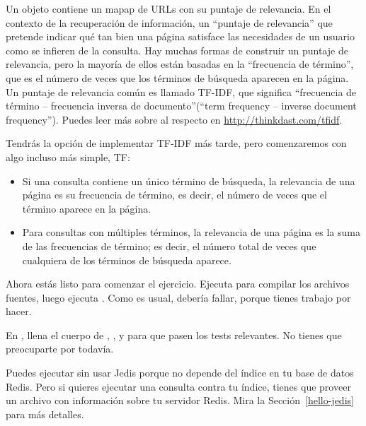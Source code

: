 \documentclass[12pt]{book}
\theoremstyle{exercise}
\begin{document}
Un objeto  contiene un mapap de URLs con su puntaje de
relevancia. En el contexto de la recuperación de información, un ``puntaje
de relevancia'' que pretende indicar qué tan bien una página satisface las
necesidades de un usuario como se infieren de la consulta. Hay muchas formas de
construir un puntaje de relevancia, pero la mayoría de ellos están basadas en
la ``frecuencia de término'', que es el número de veces que los términos de
búsqueda aparecen en la página. Un puntaje de relevancia común es llamado
TF-IDF, que significa ``frecuencia de término -- frecuencia inversa de
documento''(``term frequency -- inverse document frequency'').  Puedes leer más
sobre al respecto en \url{http://thinkdast.com/tfidf}.


Tendrás la opción de implementar TF-IDF más tarde, pero comenzaremos con algo
incluso más simple, TF:

\begin{itemize}

\item
  Si una consulta contiene un único término de búsqueda, la relevancia de una
  página es su frecuencia de término, es decir, el número de veces que el término
  aparece en la página.

\item
  Para consultas con múltiples términos, la relevancia de una página es la
  suma de las frecuencias de término; es decir, el número total de veces que
  cualquiera de los términos de búsqueda aparece.

\end{itemize}

Ahora estás listo para comenzar el ejercicio.
Ejecuta  para compilar los archivos fuentes, luego ejecuta
. Como es usual, debería fallar, porque tienes
trabajo por hacer.


En , llena el cuerpo de ,
, y  para que pasen los tests relevantes. No
tienes que preocuparte por  todavía.


Puedes ejecutar  sin usar Jedis porque no depende
del índice en tu base de datos Redis. Pero si quieres ejecutar una consulta
contra tu índice, tienes que proveer un archivo con información sobre tu
servidor Redis. Mira la Sección~\ref{hello-jedis} para más detalles.
\end{document}
